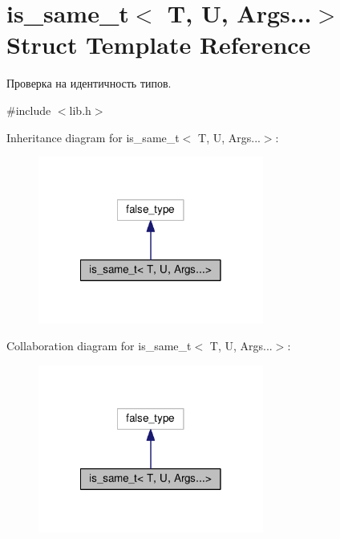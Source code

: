 \hypertarget{structis__same__t_3_01T_00_01U_00_01Args_8_8_8_4}{\section{is\-\_\-same\-\_\-t$<$ T, U, Args...$>$ Struct Template Reference}
\label{structis__same__t_3_01T_00_01U_00_01Args_8_8_8_4}
}


Проверка на идентичность типов.  




{\ttfamily \#include $<$lib.\-h$>$}



Inheritance diagram for is\-\_\-same\-\_\-t$<$ T, U, Args...$>$\-:
\nopagebreak
\begin{figure}[H]
\begin{center}
\leavevmode
\includegraphics[width=210pt]{structis__same__t_3_01T_00_01U_00_01Args_8_8_8_4__inherit__graph}
\end{center}
\end{figure}


Collaboration diagram for is\-\_\-same\-\_\-t$<$ T, U, Args...$>$\-:
\nopagebreak
\begin{figure}[H]
\begin{center}
\leavevmode
\includegraphics[width=210pt]{structis__same__t_3_01T_00_01U_00_01Args_8_8_8_4__coll__graph}
\end{center}
\end{figure}


